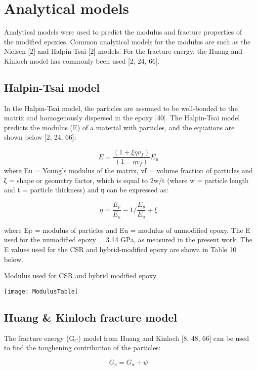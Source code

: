 \documentclass[numbers=noendperiod,chapterprefix=on]{icldt} %
\begin{document}
\section{Analytical models}
Analytical models were used to predict the modulus and fracture properties of the modified epoxies. Common analytical models for the modulus are such as the Nielsen [2] and Halpin-Tsai [2] models. For the fracture energy, the Huang and Kinloch model has commonly been used [2, 24, 66].

\subsection{Halpin-Tsai model}
In the Halpin-Tsai model, the particles are assumed to be well-bonded to the matrix and homogenously dispersed in the epoxy [40]. The Halpin-Tsai model predicts the modulus (E) of a material with particles, and the equations are shown below [2, 24, 66]:

\begin{equation} 
E=\frac{(1+\xi \eta v_f)}{(1-\eta v_f )} E_u
\end{equation}
where Eu = Young’s modulus of the matrix, vf = volume fraction of particles and ζ = shape or geometry factor, which is equal to 2w/t (where w = particle length and t = particle thickness) and η can be expressed as:

\begin{equation} 
\eta=\frac{E_p}{E_u} -1/\frac{E_p}{E_u }+\xi
\end{equation}

where Ep = modulus of particles and Eu = modulus of unmodified epoxy. 
The E used for the unmodified epoxy = 3.14 GPa, as measured in the present work. The E values used for the CSR and hybrid-modified epoxy are shown in Table 10 below. 

\begin{table}[!htpb]
\centering
\caption{Modulus used for CSR and hybrid modified epoxy } %
\texttt{[image: ModulusTable]}
\end{table}

\subsection{Huang \& Kinloch fracture model}
The fracture energy (G$_C$) model from Huang and Kinloch [8, 48, 66] can be used to find the toughening contribution of the particles:

\begin{equation} 
G_c= G_u+\psi
\end{equation}
\end{document}
